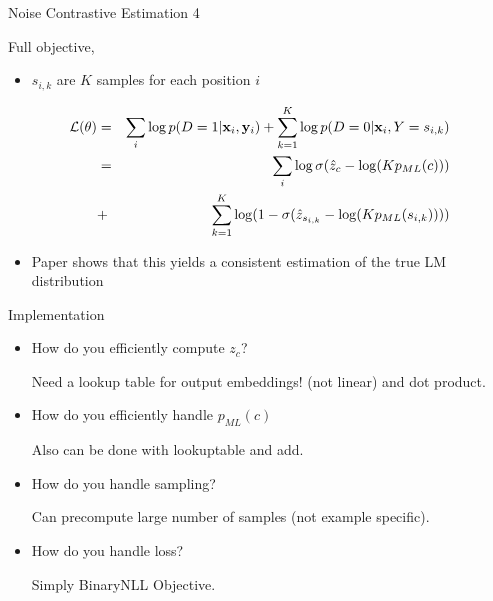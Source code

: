 \documentclass{beamer}
\begin{document}
\begin{frame}{Noise Contrastive Estimation 4}

  Full objective, 

  \begin{itemize}
  \item   $s_{i,k}$ are $K$ samples for each position $i$   
  \end{itemize}

  
  \begin{eqnarray*}
\mathcal{L}(\theta) &=& \sum_{i} \log p(D=1| \mathbf{x}_i, \mathbf{y}_i) + \sum_{k=1}^{K} \log p(D=0|\mathbf{x}_i, Y=s_{i,k})  \\
   &=& \sum_{i} \log \sigma(\hat{z}_c - \log(K p_{ML}(c))) \\
 &+&   \sum_{k=1}^{K} \log (1- \sigma(\hat{z}_{s_{i,k}} - \log(K p_{ML}(s_{i,k}))))  
 \end{eqnarray*}
 \begin{itemize}
 \item Paper shows that this yields a consistent estimation of the true LM distribution 
 \end{itemize}
\end{frame}

\begin{frame}{Implementation}
  \begin{itemize}
  \item How do you efficiently compute $z_c$?

    Need a lookup table for output embeddings! (not linear) and dot
    product.

  \item How do you efficiently handle $p_{ML}(c)$
  
    Also can be done with lookuptable and add.

  \item How do you handle sampling?

    Can precompute large number of samples (not example specific).

    \item How do you handle loss?

    Simply BinaryNLL Objective.
  \end{itemize}
\end{frame}
\end{document}

